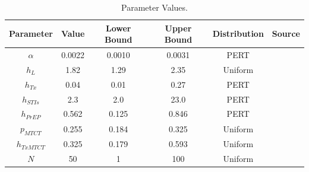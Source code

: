 \documentclass[11pt]{nih_mod}
\begin{document}
\begin{table}	
\begin{center}
  \colorbox{ECback}{
\begin{tabular}{|c|c|c|c|c|c|}
\hline
Parameter & Value& Lower Bound& Upper Bound& Distribution & Source\\
\hline
\hline
$\alpha$& 0.0022 &0.0010 & 0.0031 & PERT & \cite{Smith2010, Gray2012}\\
$h_L$ & 1.82 & 1.29 & 2.35& Uniform & \cite{Smith2010}\\
$h_{Tx}$ & 0.04 &0.01&0.27 & PERT & \cite{Cohen2011} \\ 
$h_{STIs}$ & 2.3 & 2.0 & 23.0 & PERT & \cite{Fleming1999, Gray2012} \\
$h_{PrEP}$ & 0.562 & 0.125 & 0.846 & PERT & \cite{Karim2010,Myers2011} \\
$p_{MTCT}$ & 0.255 & 0.184 & 0.325 & Uniform & \cite{Connor1994,Cock2000}\\
$h_{TxMTCT}$ & 0.325 &0.179 & 0.593 & Uniform & \cite{Connor1994,Zutlevics2006} \\
$N$ & 50 & 1 & 100 & Uniform & \\
\hline
\end{tabular}}
	\caption{Parameter Values. \label{tab:parameters}}
\end{center}
\end{table} 
\end{document}

